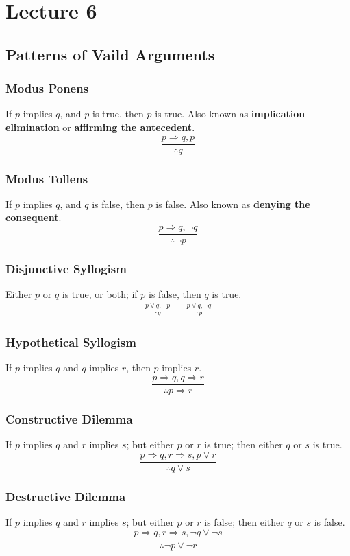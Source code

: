 \documentclass{article}
\begin{document}
\section{Lecture 6}

\subsection{Patterns of Vaild Arguments}

\subsubsection{Modus Ponens}
If $p$ implies $q$, and $p$ is true, then $p$ is true. Also known as \textbf{implication elimination} or \textbf{affirming the antecedent}.
$$ \frac{p \Rightarrow q, p}{\therefore q} $$

\subsubsection{Modus Tollens}
If $p$ implies $q$, and $q$ is false, then $p$ is false. Also known as \textbf{denying the consequent}.
$$ \frac{p \Rightarrow q, \neg q}{\therefore \neg p} $$

\subsubsection{Disjunctive Syllogism}
Either $p$ or $q$ is true, or both; if $p$ is false, then $q$ is true.
\begin{align*}
\frac{p \lor q, \neg p}{\therefore q} &&
\frac{p \lor q, \neg q}{\therefore p}
\end{align*}

\subsubsection{Hypothetical Syllogism}
If $p$ implies $q$ and $q$ implies $r$, then $p$ implies $r$.
$$ \frac{p \Rightarrow q, q \Rightarrow r}{\therefore p \Rightarrow r} $$

\subsubsection{Constructive Dilemma}
If $p$ implies $q$ and $r$ implies $s$; but either $p$ or $r$ is true; then either $q$ or $s$ is true.
$$ \frac{p \Rightarrow q, r \Rightarrow s, p \lor r}{\therefore q \lor s} $$

\subsubsection{Destructive Dilemma}
If $p$ implies $q$ and $r$ implies $s$; but either $p$ or $r$ is false; then either $q$ or $s$ is false.
$$ \frac{p \Rightarrow q, r \Rightarrow s, \neg q \lor \neg s}{\therefore \neg p \lor \neg r} $$
\end{document}

